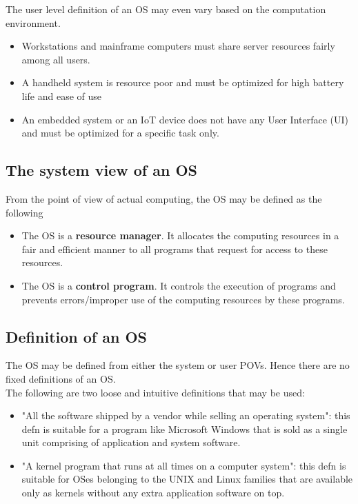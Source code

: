 \documentclass{article}
\theoremstyle{plain}
\theoremstyle{definition}
\begin{document}
    The user level definition of an OS may even vary based on the computation environment.
    
    \begin{itemize}
        \item Workstations and mainframe computers must share server resources fairly among all users.
        
        \item A handheld system is resource poor and must be optimized for high battery life and ease of use
        
        \item An embedded system or an IoT device does not have any User Interface (UI) and must be optimized for a specific task only. 
    \end{itemize}
    
    \subsection{The system view of an OS}
    
    From the point of view of actual computing, the OS may be defined as the following
    
    \begin{itemize}
        \item The OS is a \textbf{resource manager}. It allocates the computing resources in a fair and efficient manner to all programs that request for access to these resources. 
        
        \item The OS is a \textbf{control program}. It controls the execution of programs and prevents errors/improper use of the computing resources by these programs.
    \end{itemize}
    
    \subsection{Definition of an OS}
    
    The OS may be defined from either the system or user POVs. Hence there are no fixed definitions of an OS. \\
    The following are two loose and intuitive definitions that may be used:
    \begin{itemize}
        \item "All the software shipped by a vendor while selling an operating system": this defn is suitable for a program like Microsoft Windows that is sold as a single unit comprising of application and system software.
        
        \item "A kernel program that runs at all times on a computer system": this defn is suitable for OSes belonging to the UNIX and Linux families that are available only as kernels without any extra application software on top. 
    \end{itemize}
\end{document}
